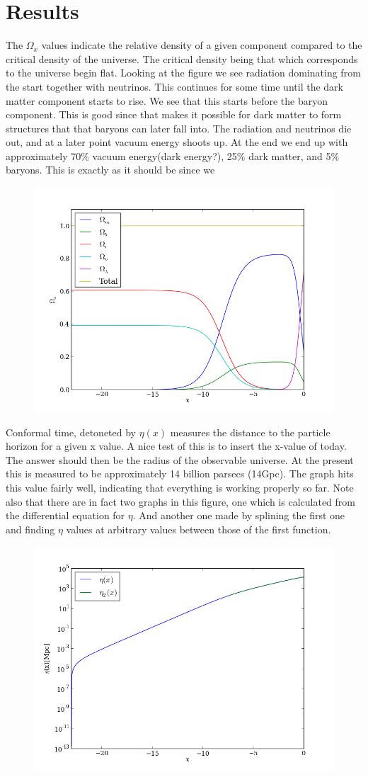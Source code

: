 \documentclass{aa}   %
\begin{document}
\section{Results}\label{sec:simulate_analytic}
 The $\Omega_x$ values indicate the relative density of a given component compared to the critical density of the universe. 
 The critical density being that which corresponds to the universe begin flat.
 Looking at the figure we see radiation dominating from the start together with neutrinos.
 This continues for some time until the dark matter component starts to rise.
 We see that this starts before the baryon component. This is good since that makes it possible for dark matter to form structures that that baryons can later fall into. The radiation and neutrinos die out, and at a later point vacuum energy shoots up. At the end we end up with approximately 70\% vacuum energy(dark energy?), 25\% dark matter, and 5\% baryons. This is exactly as it should be since we 
 \begin{figure}
  \includegraphics[width=.49\textwidth]{figure_0.png}
  \caption{}
 \label{figure0}
 \end{figure}
 
 Conformal time, detoneted by $\eta(x)$ measures the distance to the particle horizon for a given x value. A nice test of this is to insert the x-value of today.
 The answer should then be the radius of the observable universe. At the present this is measured to be approximately 14 billion parsecs (14Gpc). 
 The graph hits this value fairly well, indicating that everything is working properly so far. 
 Note also that there are in fact two graphs in this figure, one which is calculated from the differential equation for $\eta$. 
 And another one made by splining the first one and finding $\eta$ values at arbitrary values between those of the first function.
 
  \begin{figure}
  \includegraphics[width=.49\textwidth]{figure_1.png}
  \caption{}
 \label{figure1}
 \end{figure}
 
\end{document}
